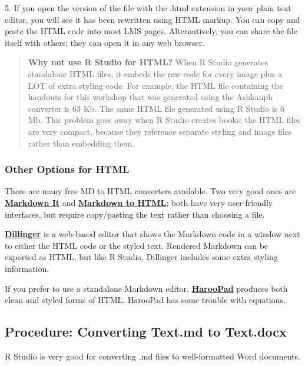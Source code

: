 \documentclass[
]{article}
\begin{document}
5. If you open the version of the file with the .html extension in your
plain text editor, you will see it has been rewritten using HTML markup.
You can copy and paste the HTML code into most LMS pages. Alternatively,
you can share the file itself with others; they can open it in any web
browser.

\begin{quote}
\textbf{Why not use R Studio for HTML?} When R Studio generates
standalone HTML files, it embeds the raw code for every image plus a LOT
of extra styling code. For example, the HTML file containing the
handouts for this workshop that was generated using the Ashkanph
converter is 63 Kb. The same HTML file generated using R Studio is 6 Mb.
This problem goes away when R Studio creates books; the HTML files are
very compact, because they reference separate styling and image files
rather than embedding them.
\end{quote}

\hypertarget{other-options-for-html}{%
\subsubsection{Other Options for HTML}\label{other-options-for-html}}

There are many free MD to HTML converters available. Two very good ones
are \textbf{\href{https://markdown-it.github.io/}{Markdown It}} and
\textbf{\href{https://markdowntohtml.com/}{Markdown to HTML}}; both have
very user-friendly interfaces, but require copy/pasting the text rather
than choosing a file.

\textbf{\href{https://dillinger.io/}{Dillinger}} is a web-based editor
that shows the Markdown code in a window next to either the HTML code or
the styled text. Rendered Markdown can be exported as HTML, but like R
Studio, Dillinger includes some extra styling information.

If you prefer to use a standalone Markdown editor,
\textbf{\href{http://pad.haroopress.com/}{HarooPad}} produces both clean
and styled forms of HTML. HarooPad has some trouble with equations.

\hypertarget{procedure-converting-text.md-to-text.docx}{%
\subsection{Procedure: Converting Text.md to
Text.docx}\label{procedure-converting-text.md-to-text.docx}}

R Studio is very good for converting .md files to well-formatted Word
documents.
\end{document}
